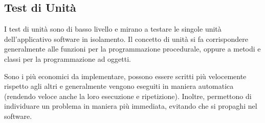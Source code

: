 \subsection{Test di Unità}
\par I test di unità sono di basso livello e mirano a testare le singole unità dell'applicativo software in isolamento. Il concetto di unità si fa corrispondere generalmente alle funzioni per la programmazione procedurale, oppure a metodi e classi per la programmazione ad oggetti.
\par Sono i più economici da implementare, possono essere scritti più velocemente rispetto agli altri e generalmente vengono eseguiti in maniera automatica (rendendo veloce anche la loro esecuzione e ripetizione). Inoltre, permettono di individuare un problema in maniera più immediata, evitando che si propaghi nel software.
\renewcommand{\arraystretch}{1.5}
